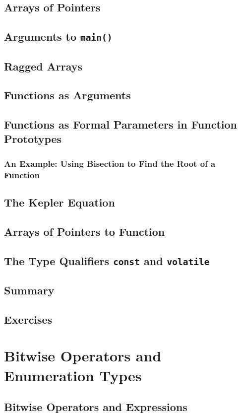 \documentclass[12pt]{book}
\begin{document}
\section{Arrays of Pointers}
\section{Arguments to \texttt{main()}}
\section{Ragged Arrays}
\section{Functions as Arguments}
\section{Functions as Formal Parameters in Function Prototypes}
\subsection{An Example: Using Bisection to Find the Root of a Function}
\section{The Kepler Equation}
\section{Arrays of Pointers to Function}
\section{The Type Qualifiers \texttt{const} and \texttt{volatile}}
\section{Summary}
\section{Exercises}

\chapter{Bitwise Operators and Enumeration Types}

\section{Bitwise Operators and Expressions}
\end{document}
